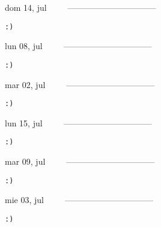 \documentclass[letterpaper,10pt]{article}
\begin{document}
\begin{multicols}{3}
{dom 14, jul\ \ \ \ \ --------------------------------}
\begin{flushright}\begin{small}\texttt{:)}\end{small}\end{flushright}
\vfill
{lun 08, jul\ \ \ \ \ --------------------------------}
\begin{flushright}\begin{small}\texttt{:)}\end{small}\end{flushright}\par
\vfill
{mar 02, jul\ \ \ \ \ --------------------------------}
\begin{flushright}\begin{small}\texttt{:)}\end{small}\end{flushright}\par
\vfill
\end{multicols}
\vspace{1.05cm}

\begin{multicols}{3}
{lun 15, jul\ \ \ \ \ --------------------------------}
\begin{flushright}\begin{small}\texttt{:)}\end{small}\end{flushright}
\vfill
{mar 09, jul\ \ \ \ \ --------------------------------}
\begin{flushright}\begin{small}\texttt{:)}\end{small}\end{flushright}\par
\vfill
{mie 03, jul\ \ \ \ \ --------------------------------}
\begin{flushright}\begin{small}\texttt{:)}\end{small}\end{flushright}\par
\vfill
\end{multicols}
\vspace{1.05cm}
\end{document}
